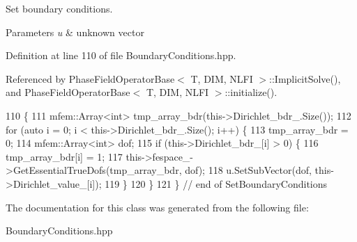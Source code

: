 Set boundary conditions. 


\begin{DoxyParams}{Parameters}
{\em u} & unknown vector \\
\hline
\end{DoxyParams}


Definition at line 110 of file Boundary\+Conditions.\+hpp.



Referenced by Phase\+Field\+Operator\+Base$<$ T, D\+I\+M, N\+L\+F\+I $>$\+::\+Implicit\+Solve(), and Phase\+Field\+Operator\+Base$<$ T, D\+I\+M, N\+L\+F\+I $>$\+::initialize().


\begin{DoxyCode}
110                                                                     \{
111   mfem::Array<int> tmp\_array\_bdr(this->Dirichlet\_bdr\_.Size());
112   \textcolor{keywordflow}{for} (\textcolor{keyword}{auto} i = 0; i < this->Dirichlet\_bdr\_.Size(); i++) \{
113     tmp\_array\_bdr = 0;
114     mfem::Array<int> dof;
115     \textcolor{keywordflow}{if} (this->Dirichlet\_bdr\_[i] > 0) \{
116       tmp\_array\_bdr[i] = 1;
117       this->fespace\_->GetEssentialTrueDofs(tmp\_array\_bdr, dof);
118       u.SetSubVector(dof, this->Dirichlet\_value\_[i]);
119     \}
120   \}
121 \}  \textcolor{comment}{// end of SetBoundaryConditions}
\end{DoxyCode}


The documentation for this class was generated from the following file\+:\begin{DoxyCompactItemize}
\item 
Boundary\+Conditions.\+hpp\end{DoxyCompactItemize}
